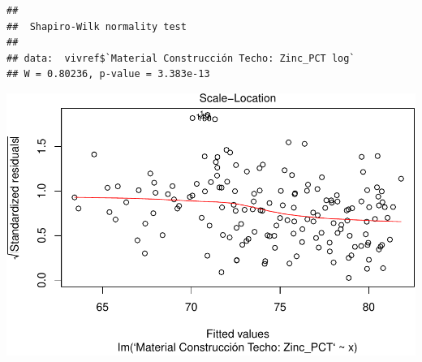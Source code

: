 \documentclass[11pt,]{article}
\newenvironment{Shaded}{\begin{snugshade}}{\end{snugshade}}
\newcommand{\KeywordTok}[1]{\textcolor[rgb]{0.13,0.29,0.53}{\textbf{#1}}}
\newcommand{\DataTypeTok}[1]{\textcolor[rgb]{0.13,0.29,0.53}{#1}}
\newcommand{\DecValTok}[1]{\textcolor[rgb]{0.00,0.00,0.81}{#1}}
\newcommand{\StringTok}[1]{\textcolor[rgb]{0.31,0.60,0.02}{#1}}
\newcommand{\OperatorTok}[1]{\textcolor[rgb]{0.81,0.36,0.00}{\textbf{#1}}}
\newcommand{\NormalTok}[1]{#1}
\begin{document}
\begin{Shaded}
\end{Shaded}

\begin{verbatim}
## 
##  Shapiro-Wilk normality test
## 
## data:  vivref$`Material Construcción Techo: Zinc_PCT log`
## W = 0.80236, p-value = 3.383e-13
\end{verbatim}

\begin{Shaded}
\end{Shaded}

\includegraphics{proyecto_files/figure-latex/unnamed-chunk-2-10.pdf}

\begin{Shaded}
\end{Shaded}
\end{document}
